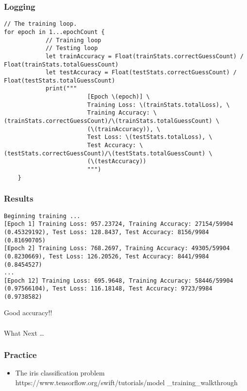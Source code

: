 \begin{frame}[fragile] \frametitle{Logging}

\begin{lstlisting}[basicstyle=\scriptsize]
// The training loop.
for epoch in 1...epochCount {
			// Training loop
			// Testing loop
			let trainAccuracy = Float(trainStats.correctGuessCount) / Float(trainStats.totalGuessCount)
			let testAccuracy = Float(testStats.correctGuessCount) / Float(testStats.totalGuessCount)
			print("""
						[Epoch \(epoch)] \
						Training Loss: \(trainStats.totalLoss), \
						Training Accuracy: \(trainStats.correctGuessCount)/\(trainStats.totalGuessCount) \
						(\(trainAccuracy)), \
						Test Loss: \(testStats.totalLoss), \
						Test Accuracy: \(testStats.correctGuessCount)/\(testStats.totalGuessCount) \
						(\(testAccuracy))
						""")			
    }
\end{lstlisting}

\end{frame}

\begin{frame}[fragile] \frametitle{Results}

\begin{lstlisting}[basicstyle=\scriptsize]
Beginning training ...
[Epoch 1] Training Loss: 957.23724, Training Accuracy: 27154/59904 (0.45329192), Test Loss: 128.8437, Test Accuracy: 8156/9984 (0.81690705) 
[Epoch 2] Training Loss: 768.2697, Training Accuracy: 49305/59904 (0.8230669), Test Loss: 126.20526, Test Accuracy: 8441/9984 (0.8454527) 
...
[Epoch 12] Training Loss: 695.9648, Training Accuracy: 58446/59904 (0.97566104), Test Loss: 116.18148, Test Accuracy: 9723/9984 (0.9738582)
\end{lstlisting}

Good accuracy!!

\end{frame}

\begin{frame}[fragile]\frametitle{}
\begin{center}
{\Large What Next \ldots }
\end{center}
\end{frame}

\begin{frame}[fragile] \frametitle{Practice}

\begin{itemize}
\item The iris classification problem https://www.tensorflow.org/swift/tutorials/model \_training\_walkthrough
\end{itemize}

\end{frame}


